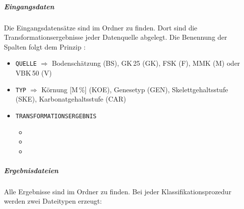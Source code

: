 \subparagraph*{Eingangsdaten}
Die Eingangsdatensätze sind im Ordner 
 zu finden. Dort sind die Transformationsergebnisse jeder Datenquelle abgelegt. Die Benennung der Spalten folgt dem  Prinzip
\say{[QUELLE]\_[TYP]\_[TRANSFORMATIONSERGEBNIS]}:
\begin{itemize}
\item \texttt{QUELLE} $\Rightarrow$ Bodenschätzung (BS), GK\,25 (GK), FSK (F), MMK (M) oder VBK\,50 (V)
\item \texttt{TYP} $\Rightarrow$ Körnung [M\,\%] (KOE), Genesetyp (GEN), Skelettgehaltsstufe (SKE), Karbonatgehaltsstufe (CAR) 
\item \texttt{TRANSFORMATIONSERGEBNIS} 
\begin{itemize}
\item {}
\item {}
\item {}
\end{itemize}
\end{itemize}

\subparagraph*{Ergebnisdateien}
Alle Ergebnisse sind im Ordner  zu finden. Bei jeder Klassifikationsprozedur werden zwei Dateitypen erzeugt:

